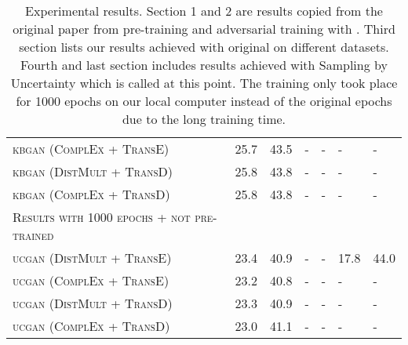 \begin{table}[h]
\begin{tabular}{lllllll}
          \textsc{kbgan} (\textsc{ComplEx} + \textsc{TransE})  & 25.7 & 43.5 & - & - & - & - \\
          
          \textsc{kbgan} (\textsc{DistMult} + \textsc{TransD})  & 25.8 & 43.8 & - & - & - & - \\

          \textsc{kbgan} (\textsc{ComplEx} + \textsc{TransD})  & 25.8 & 43.8 & - & - & - & - \\
          
          \midrule
         
         \textsc{Results with 1000 epochs + not pre-trained} 
          &  &  &  &  &  & \\
          
          \textsc{ucgan} (\textsc{DistMult} + \textsc{TransE}) 
          & 23.4  & 40.9 & - & - & 17.8 & 44.0\\
         
         \textsc{ucgan} (\textsc{ComplEx} + \textsc{TransE}) 
          & 23.2  & 40.8 & - & - & - & - \\
          
          \textsc{ucgan} (\textsc{DistMult} + \textsc{TransD}) 
          & 23.3 & 40.9 & - & - & - & - \\
        
        \textsc{ucgan} (\textsc{ComplEx} + \textsc{TransD}) 
          & 23.0  & 41.1 & - & - & - & - \\
          
        \bottomrule
    \end{tabular}
    \caption{Experimental results.
    Section 1 and 2 are results copied from the original paper \cite{cai2017kbgan} from pre-training and adversarial training with \kbgan. 
    Third section lists our results achieved with original \kbgan on different datasets.
    Fourth and last section includes results achieved with Sampling by Uncertainty which is called \ucgan at this point.
    The training only took place for 1000 epochs on our local computer instead of the original  epochs due to the long training time.}
\label{tab:results}
\end{table}